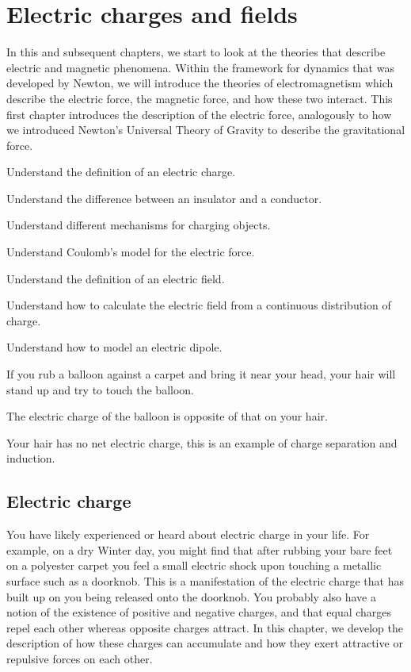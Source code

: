 
\chapter{Electric charges and fields}
\label{chapter:chargesfields}
In this and subsequent chapters, we start to look at the theories that describe electric and magnetic phenomena. Within the framework for dynamics that was developed by Newton, we will introduce the theories of electromagnetism which describe the electric force, the magnetic force, and how these two interact. This first chapter introduces the description of the electric force, analogously to how we introduced Newton's Universal Theory of Gravity to describe the gravitational force. 


\begin{learningObjectives}{
 \item Understand the definition of an electric charge.
 \item Understand the difference between an insulator and a conductor.
 \item Understand different mechanisms for charging objects.
 \item Understand Coulomb's model for the electric force.
 \item Understand the definition of an electric field.
 \item Understand how to calculate the electric field from a continuous distribution of charge.
 \item Understand how to model an electric dipole.
 }
\end{learningObjectives}

\begin{opening}
\begin{MCquestion}{If you rub a balloon against a carpet and bring it near your head, your hair will stand up and try to touch the balloon.}
\item The electric charge of the balloon is opposite of that on your hair.
\item Your hair has no net electric charge, this is an example of charge separation and induction. \correct
\end{MCquestion}
\end{opening}

\section{Electric charge}
You have likely experienced or heard about electric charge in your life. For example, on a dry Winter day, you might find that after rubbing your bare feet on a polyester carpet you feel a small electric shock upon touching a metallic surface such as a doorknob. This is a manifestation of the electric charge that has built up on you being released onto the doorknob. You probably also have a notion of the existence of positive and negative charges, and that equal charges repel each other whereas opposite charges attract. In this chapter, we develop the description of how these charges can accumulate and how they exert attractive or repulsive forces on each other. 

